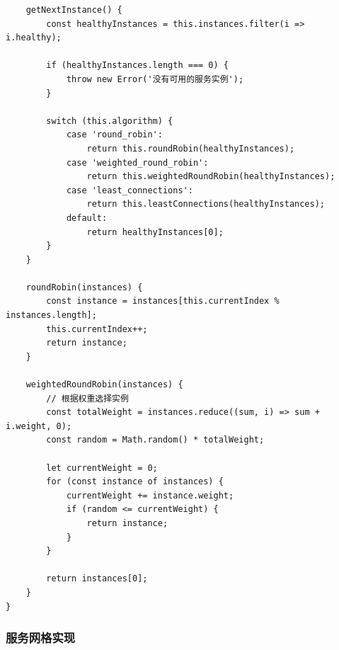 \begin{lstlisting}
    getNextInstance() {
        const healthyInstances = this.instances.filter(i => i.healthy);
        
        if (healthyInstances.length === 0) {
            throw new Error('没有可用的服务实例');
        }
        
        switch (this.algorithm) {
            case 'round_robin':
                return this.roundRobin(healthyInstances);
            case 'weighted_round_robin':
                return this.weightedRoundRobin(healthyInstances);
            case 'least_connections':
                return this.leastConnections(healthyInstances);
            default:
                return healthyInstances[0];
        }
    }
    
    roundRobin(instances) {
        const instance = instances[this.currentIndex % instances.length];
        this.currentIndex++;
        return instance;
    }
    
    weightedRoundRobin(instances) {
        // 根据权重选择实例
        const totalWeight = instances.reduce((sum, i) => sum + i.weight, 0);
        const random = Math.random() * totalWeight;
        
        let currentWeight = 0;
        for (const instance of instances) {
            currentWeight += instance.weight;
            if (random <= currentWeight) {
                return instance;
            }
        }
        
        return instances[0];
    }
}
\end{lstlisting}

\subsubsection{服务网格实现}\label{ux670dux52a1ux7f51ux683cux5b9eux73b0}

